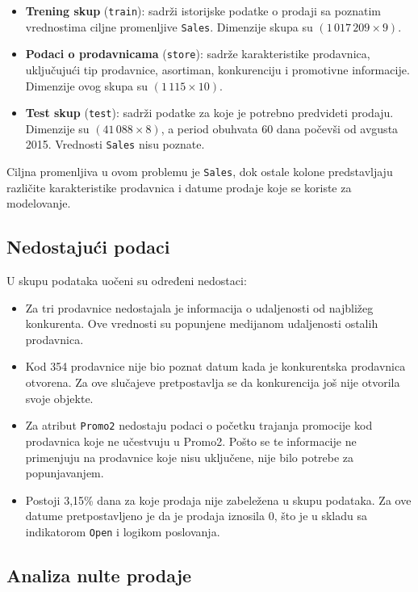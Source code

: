 \documentclass[12pt]{article}
\begin{document}
\begin{itemize}
    \item \textbf{Trening skup} (\texttt{train}): sadrži istorijske podatke o prodaji sa poznatim vrednostima ciljne promenljive \texttt{Sales}. Dimenzije skupa su $(1\,017\,209 \times 9)$.
    \item \textbf{Podaci o prodavnicama} (\texttt{store}): sadrže karakteristike prodavnica, uključujući tip prodavnice, asortiman, konkurenciju i promotivne informacije. Dimenzije ovog skupa su $(1\,115 \times 10)$.
    \item \textbf{Test skup} (\texttt{test}): sadrži podatke za koje je potrebno predvideti prodaju. Dimenzije su $(41\,088 \times 8)$, a period obuhvata 60 dana počevši od avgusta 2015. Vrednosti \texttt{Sales} nisu poznate.
\end{itemize}

Ciljna promenljiva u ovom problemu je \texttt{Sales}, dok ostale kolone predstavljaju različite karakteristike prodavnica i datume prodaje koje se koriste za modelovanje.


\subsection{Nedostajući podaci}

U skupu podataka uočeni su određeni nedostaci:  

\begin{itemize}
    \item Za tri prodavnice nedostajala je informacija o udaljenosti od najbližeg konkurenta. Ove vrednosti su popunjene medijanom udaljenosti ostalih prodavnica.
    \item Kod 354 prodavnice nije bio poznat datum kada je konkurentska prodavnica otvorena. Za ove slučajeve pretpostavlja se da konkurencija još nije otvorila svoje objekte.
    \item Za atribut \texttt{Promo2} nedostaju podaci o početku trajanja promocije kod prodavnica koje ne učestvuju u Promo2. Pošto se te informacije ne primenjuju na prodavnice koje nisu uključene, nije bilo potrebe za popunjavanjem.
    \item Postoji 3,15\% dana za koje prodaja nije zabeležena u skupu podataka. Za ove datume pretpostavljeno je da je prodaja iznosila 0, što je u skladu sa indikatorom \texttt{Open} i logikom poslovanja.
\end{itemize}
\newpage
\subsection{Analiza nulte prodaje}
\end{document}
